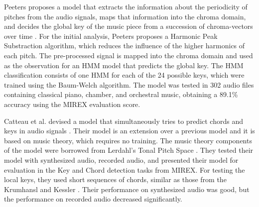 
Peeters proposes a model that extracts the information about
the periodicity of pitches from the audio signals, maps that
information into the chroma domain, and decides the global
key of the music piece from a succession of chroma-vectors
over time \cite{peeters2006chromabased}. For the initial
analysis, Peeters proposes a Harmonic Peak Substraction
algorithm, which reduces the influence of the higher
harmonics of each pitch. The pre-processed signal is mapped
into the chroma domain and used as the observation for an
HMM model that predicts the global key. The HMM
classification consists of one HMM for each of the 24
possible keys, which were trained using the Baum-Welch
algorithm. The model was tested in 302 audio files
containing classical piano, chamber, and orchestral music,
obtaining a 89.1\% accuracy using the MIREX evaluation
score.



Catteau et al. devised a model that simultaneously tries to
predict chords and keys in audio signals
\cite{catteau2007probabilistic}. Their model is an extension
over a previous model \cite{bello2005robust} and it is based
on music theory, which requires no training. The music
theory components of the model were borrowed from Lerdahl's
Tonal Pitch Space \cite{lerdahl2005tonal}. They tested their
model with synthesized audio, recorded audio, and presented
their model for evaluation in the Key and Chord detection
tasks from MIREX. For testing the local keys, they used
short sequences of chords, similar as those from the
Krumhansl and Kessler \cite{krumhansl1982tracing}. Their
performance on synthesized audio was good, but the
performance on recorded audio decreased significantly.

